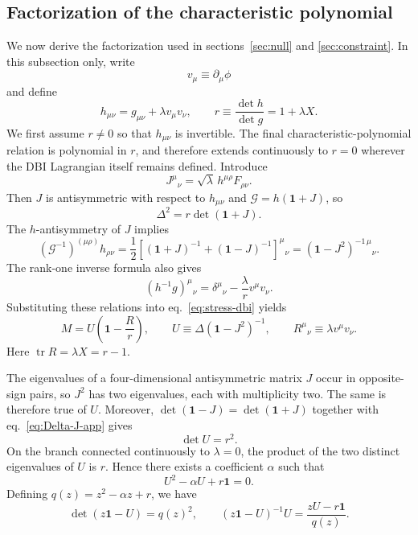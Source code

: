 \documentclass[a4paper,11pt]{article}
\numberwithin{equation}{section}
\newcommand{\tr}{\operatorname{tr}}
\newcommand{\G}{\mathcal G}
\newcommand{\Id}{\mathbf 1}
\begin{document}
\subsection{Factorization of the characteristic polynomial}

We now derive the factorization used in sections~\ref{sec:null} and \ref{sec:constraint}. In this subsection only, write
\begin{equation}
 v_\mu\equiv\partial_\mu\phi
\end{equation}
and define
\begin{equation}
 h_{\mu\nu}=g_{\mu\nu}+\lambda v_\mu v_\nu,
 \qquad
 r\equiv\frac{\det h}{\det g}=1+\lambda X.
 \label{eq:h-r-app}
\end{equation}
We first assume $r\neq0$ so that $h_{\mu\nu}$ is invertible. The final characteristic-polynomial relation is polynomial in $r$, and therefore extends continuously to $r=0$ wherever the DBI Lagrangian itself remains defined. Introduce
\begin{equation}
 J^\mu{}_{\nu}=\sqrt\lambda\,h^{\mu\rho}F_{\rho\nu}.
 \label{eq:J-app}
\end{equation}
Then $J$ is antisymmetric with respect to $h_{\mu\nu}$ and $\G=h(\Id+J)$, so
\begin{equation}
 \Delta^2=r\det(\Id+J).
 \label{eq:Delta-J-app}
\end{equation}
The $h$-antisymmetry of $J$ implies
\begin{equation}
 (\G^{-1})^{(\mu\rho)}h_{\rho\nu}
 =\frac12\left[(\Id+J)^{-1}+(\Id-J)^{-1}\right]^\mu{}_{\nu}
 =(\Id-J^2)^{-1\,\mu}{}_{\nu}.
 \label{eq:symmetric-inverse-app}
\end{equation}
The rank-one inverse formula also gives
\begin{equation}
 (h^{-1}g)^\mu{}_{\nu}
 =\delta^\mu{}_{\nu}-\frac{\lambda}{r}v^\mu v_\nu.
 \label{eq:hinvg-app}
\end{equation}
Substituting these relations into eq.~\eqref{eq:stress-dbi} yields
\begin{equation}
 M=U\left(\Id-\frac{R}{r}\right),
 \qquad
 U\equiv\Delta(\Id-J^2)^{-1},
 \qquad
 R^\mu{}_{\nu}\equiv\lambda v^\mu v_\nu.
 \label{eq:M-U-R-app}
\end{equation}
Here $\tr R=\lambda X=r-1$.

The eigenvalues of a four-dimensional antisymmetric matrix $J$ occur in opposite-sign pairs, so $J^2$ has two eigenvalues, each with multiplicity two. The same is therefore true of $U$. Moreover, $\det(\Id-J)=\det(\Id+J)$ together with eq.~\eqref{eq:Delta-J-app} gives
\begin{equation}
 \det U=r^2.
\end{equation}
On the branch connected continuously to $\lambda=0$, the product of the two distinct eigenvalues of $U$ is $r$. Hence there exists a coefficient $\alpha$ such that
\begin{equation}
 U^2-\alpha U+r\Id=0.
 \label{eq:U-quadratic-app}
\end{equation}
Defining $q(z)=z^2-\alpha z+r$, we have
\begin{equation}
 \det(z\Id-U)=q(z)^2,
 \qquad
 (z\Id-U)^{-1}U=\frac{zU-r\Id}{q(z)}.
 \label{eq:U-resolvent-app}
\end{equation}
\end{document}
